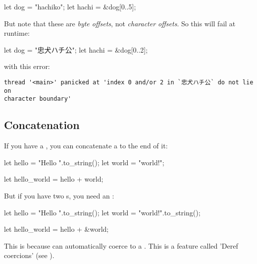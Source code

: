 \begin{rustc}
let dog = "hachiko";
let hachi = &dog[0..5];
\end{rustc}

But note that these are \emph{byte offsets}, not \emph{character offsets}. So this will fail at runtime:

\begin{rustc}
let dog = "忠犬ハチ公";
let hachi = &dog[0..2];
\end{rustc}

with this error:

\begin{verbatim}
thread '<main>' panicked at 'index 0 and/or 2 in `忠犬ハチ公` do not lie on
character boundary'
\end{verbatim}

\subsection*{Concatenation}

If you have a \String, you can concatenate a  to the end of it:

\begin{rustc}
let hello = "Hello ".to_string();
let world = "world!";

let hello_world = hello + world;
\end{rustc}

But if you have two \String s, you need an \code{\&}:

\begin{rustc}
let hello = "Hello ".to_string();
let world = "world!".to_string();

let hello_world = hello + &world;
\end{rustc}

This is because  can automatically coerce to a . This is a feature called 'Deref coercions' (see 
).
